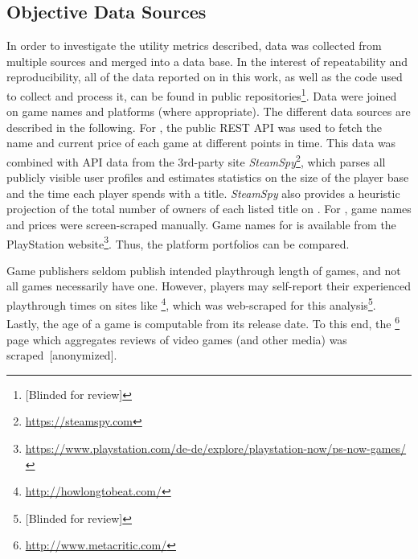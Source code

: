 \subsection{Objective Data Sources}
In order to investigate the utility metrics described, data was collected from
multiple sources and merged
into a data base. In the interest of repeatability and
reproducibility, all of the data reported on in this work, as well as
the code used to collect and process it, can be found in public
repositories\footnote{[Blinded for review]}.
Data were joined on game names and platforms (where appropriate).
The different data sources are described in the following.
For \steam, the public \acrshort{REST} \acrshort{API} was used to
fetch the name and current price of each game at different points in
time.
This data was combined with \acrshort{API} data from the 3rd-party site
\textit{SteamSpy}\footnote{\url{https://steamspy.com}}, which parses all
publicly visible \steam user profiles and
estimates statistics on the size of the player base and the time each
player spends with a title. \textit{SteamSpy} also provides a heuristic
projection of the total number of owners of each listed title on \steam.
For \gfnow, game names and prices were screen-scraped manually.
Game names for \psnow is available from the PlayStation
website\footnote{\url{https://www.playstation.com/de-de/explore/playstation-now/ps-now-games/}}.
Thus, the platform portfolios can be compared.

Game publishers seldom publish intended playthrough
length of games, and not all games necessarily have one. However, players
may self-report their experienced playthrough times on sites like
\hltb\footnote{\url{http://howlongtobeat.com/}}, which was web-scraped
for this analysis\footnote{[Blinded for review]}.
Lastly, the age of a game is computable from its release date. To this end, the
\metacritic\footnote{\url{http://www.metacritic.com/}} page which
aggregates reviews of video games (and other media) was
scraped~[anonymized].



